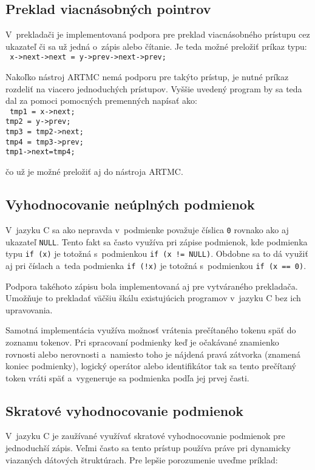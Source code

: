 \subsection{Preklad viacnásobných pointrov}
V~prekladači je implementovaná podpora pre preklad viacnásobného prístupu cez ukazateľ či sa už jedná o~zápis alebo čítanie. Je teda možné preložiť príkaz typu:\\

\noindent
\texttt{
x->next->next = y->prev->next->prev;\\
}

Nakoľko nástroj ARTMC nemá podporu pre takýto prístup, je nutné príkaz rozdeliť na viacero jednoduchých prístupov. Vyššie uvedený program by sa teda dal za pomoci pomocných premenných napísať ako:\\

\noindent
\texttt{
tmp1 = x->next;\\
tmp2 = y->prev;\\
tmp3 = tmp2->next;\\
tmp4 = tmp3->prev;\\
tmp1->next=tmp4;\\
}

čo už je možné preložiť aj do nástroja ARTMC.

\subsection{Vyhodnocovanie neúplných podmienok}
V~jazyku C sa ako nepravda v~podmienke považuje číslica \texttt{0} rovnako ako aj ukazateľ \texttt{NULL}. Tento fakt sa často využíva pri zápise podmienok, kde podmienka typu \texttt{if (x)} je totožná s~podmienkou \texttt{if (x != NULL)}. Obdobne sa to dá využiť aj pri číslach a~teda podmienka \texttt{if (!x)} je totožná s~podmienkou \texttt{if (x == 0)}.

Podpora takéhoto zápisu bola implementovaná aj pre vytváraného prekladača. Umožňuje to prekladať väčšiu škálu existujúcich programov v~jazyku C bez ich upravovania.

Samotná implementácia využíva možnosť vrátenia prečítaného tokenu späť do zoznamu tokenov. Pri spracovaní podmienky keď je očakávané znamienko rovnosti alebo nerovnosti a~namiesto toho je nájdená pravá zátvorka (znamená koniec podmienky), logický operátor alebo identifikátor tak sa tento prečítaný token vráti späť a~vygeneruje sa podmienka podľa jej prvej časti.

\subsection{Skratové vyhodnocovanie podmienok}
V~jazyku C je zaužívané využívať skratové vyhodnocovanie podmienok pre jednoduchší zápis. Veľmi často sa tento prístup používa práve pri dynamicky viazaných dátových štruktúrach. Pre lepšie porozumenie uveďme príklad:\\

